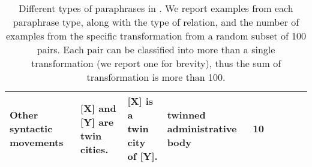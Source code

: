 \begin{table*}[t!]
{\begin{tabular}{lllllllll}
Other syntactic movements & [X] and [Y] are twin cities. & [X] is a twin city of [Y]. & twinned administrative body & 10 \\








\bottomrule
\end{tabular}


}
\caption{Different types of paraphrases in \resource{}. We report examples from each paraphrase type, along with the type of relation, and the number of examples from the specific transformation from a random subset of 100 pairs. Each pair can be classified into more than a single transformation (we report one for brevity), thus the sum of transformation is more than 100.}
\label{tab:paraphrases_analysis}
    
\end{table*}
